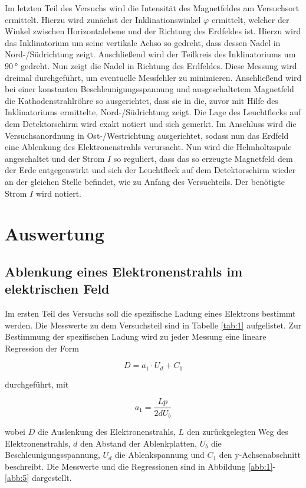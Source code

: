 \noindent Im letzten Teil des Versuchs wird die Intensität des Magnetfeldes am Versuchsort ermittelt.
Hierzu wird zunächst der Inklinationswinkel $\varphi$ ermittelt, welcher der Winkel zwischen Horizontalebene
und der Richtung des Erdfeldes ist. Hierzu wird das Inklinatorium um seine vertikale Achso so gedreht, dass
dessen Nadel in Nord-/Südrichtung zeigt. Anschließend wird der Teilkreis des Inklinatoriums um $\SI{90}{\degree}$
gedreht. Nun zeigt die Nadel in Richtung des Erdfeldes. Diese Messung wird dreimal durchgeführt, um eventuelle
Messfehler zu minimieren.
Anschließend wird bei einer konstanten Beschleunigungsspannung und ausgeschaltetem Magnetfeld
die Kathodenstrahlröhre so ausgerichtet, dass sie in die, zuvor mit Hilfe des Inklinatoriums ermittelte,
Nord-/Südrichtung zeigt. Die Lage des Leuchtflecks auf dem Detektorschirm wird exakt notiert und sich gemerkt.
Im Anschluss wird die Versuchsanordnung in Ost-/Westrichtung ausgerichtet, sodass nun das Erdfeld eine
Ablenkung des Elektronenstrahls verursacht. Nun wird die Helmholtzspule angeschaltet und
der Strom $I$ so reguliert, dass das so erzeugte Magnetfeld dem der Erde entgegenwirkt und sich
der Leuchtfleck auf dem Detektorschirm wieder an der gleichen Stelle befindet, wie zu Anfang des Versuchteils.
Der benötigte Strom $I$ wird notiert.


\section{Auswertung}

\subsection{Ablenkung eines Elektronenstrahls im elektrischen Feld}
Im ersten Teil des Versuchs soll die spezifische Ladung eines Elektrons bestimmt werden. Die Messwerte zu dem Versuchsteil
sind in Tabelle \ref{tab:1} aufgelistet. Zur Bestimmung der spezifischen Ladung wird zu jeder Messung eine lineare Regression der Form

\begin{equation*}
  D = a_1 \cdot U_d + C_1
\end{equation*}

durchgeführt, mit

\begin{equation*}
  a_1 = \frac{Lp}{2 d U_b}
\end{equation*}

wobei $D$ die Auslenkung des Elektronenstrahls, $L$ den zurückgelegten Weg des Elektronenstrahls,
$d$ den Abstand der Ablenkplatten, $U_b$ die Beschleunigungsspannung, $U_d$ die Ablenkspannung und $C_1$ den y-Achsenabschnitt beschreibt.
Die Messwerte und die Regressionen sind in Abbildung \ref{abb:1}- \ref{abb:5} dargestellt.


